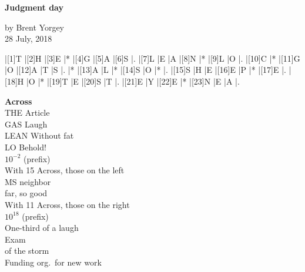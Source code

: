 \documentclass[12pt]{article}
\begin{document}
\begin{center}
{\large \textbf{Judgment day}} \medskip

{\small by Brent Yorgey \\
  28 July, 2018}
\end{center}
\medskip

\begin{Puzzle}{7}{7}
  |[1]T  |[2]H  |[3]E  |*     |[4]G  |[5]A  |[6]S  |.
  |[7]L  |E     |A     |[8]N  |*     |[9]L  |O     |.
  |[10]C |*     |[11]G |O     |[12]A |T     |S     |.
  |*     |[13]A |L     |*     |[14]S |O     |*     |.
  |[15]S |H     |E     |[16]E |P     |*     |[17]E |.
  |[18]H |O     |*     |[19]T |E     |[20]S |T     |.
  |[21]E |Y     |[22]E |*     |[23]N |E     |A     |.
\end{Puzzle}

\begin{PuzzleClues}{\textbf{Across}}\bigskip \\
   {THE}   {Article} \\
   {GAS}   {Laugh} \\
   {LEAN}  {Without fat} \\
   {LO}    {Behold!} \\
       {$10^{-2}$ (prefix)} \\
   {With 15 Across, those on the left} \\
      {MS neighbor} \\
      {\underline{\phantom{SOO}} far, so good} \\
   {With 11 Across, those on the right} \\
       {$10^{18}$ (prefix)} \\
      {One-third of a laugh} \\
    {Exam} \\
     {\underline{\phantom{EYE}} of the storm} \\
     {Funding org.\ for new work}
\end{PuzzleClues}
\end{document}

